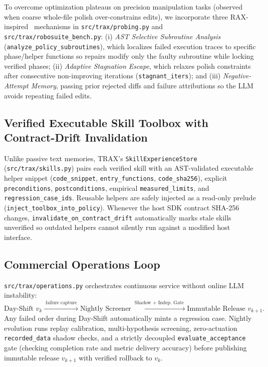 \documentclass{trax}
\begin{document}
To overcome optimization plateaus on precision manipulation tasks (observed when coarse whole-file polish over-constrains edits), we incorporate three RAX-inspired~\cite{huang2026rax} mechanisms in \texttt{src/trax/probing.py} and \texttt{src/trax/robosuite\_bench.py}: (i) \emph{AST Selective Subroutine Analysis} (\texttt{analyze\_policy\_subroutines}), which localizes failed execution traces to specific phase/helper functions so repairs modify only the faulty subroutine while locking verified phases; (ii) \emph{Adaptive Stagnation Escape}, which relaxes polish constraints after consecutive non-improving iterations (\texttt{stagnant\_iters}); and (iii) \emph{Negative-Attempt Memory}, passing prior rejected diffs and failure attributions so the LLM avoids repeating failed edits.

\subsection{Verified Executable Skill Toolbox with Contract-Drift Invalidation}
Unlike passive text memories, TRAX's \texttt{SkillExperienceStore} (\texttt{src/trax/skills.py}) pairs each verified skill with an AST-validated executable helper snippet (\texttt{code\_snippet}, \texttt{entry\_functions}, \texttt{code\_sha256}), explicit \texttt{preconditions}, \texttt{postconditions}, empirical \texttt{measured\_limits}, and \texttt{regression\_case\_ids}. Reusable helpers are safely injected as a read-only prelude (\texttt{inject\_toolbox\_into\_policy}). Whenever the host SDK contract SHA-256 changes, \texttt{invalidate\_on\_contract\_drift} automatically marks stale skills unverified so outdated helpers cannot silently run against a modified host interface.

\subsection{Commercial Operations Loop}
\texttt{src/trax/operations.py} orchestrates continuous service without online LLM instability:
\begin{equation}
    \text{Day-Shift } v_k \xrightarrow{\;\text{failure capture}\;} \text{Nightly Screener} \xrightarrow{\;\text{Shadow + Indep.\ Gate}\;} \text{Immutable Release } v_{k+1}.
\end{equation}
Any failed order during Day-Shift automatically mints a regression case. Nightly evolution runs replay calibration, multi-hypothesis screening, zero-actuation \texttt{recorded\_data} shadow checks, and a strictly decoupled \texttt{evaluate\_acceptance} gate (checking completion rate and metric delivery accuracy) before publishing immutable release $v_{k+1}$ with verified rollback to $v_k$.
\end{document}
